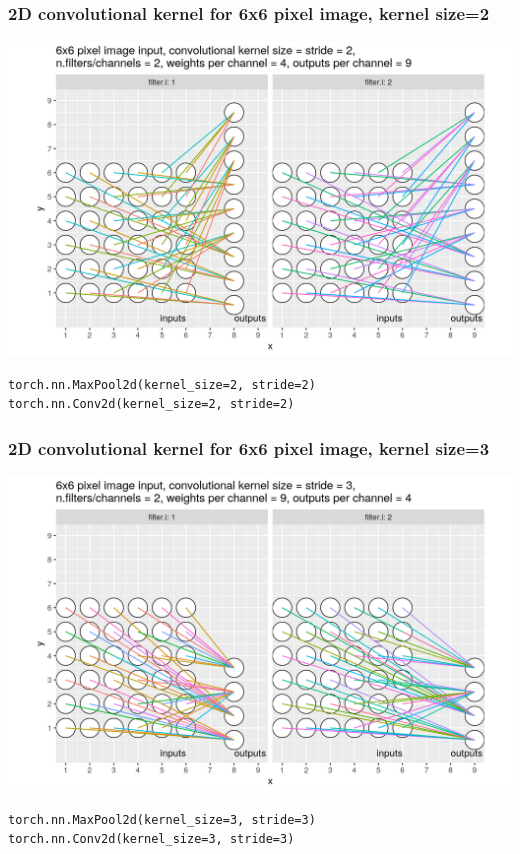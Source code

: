 \documentclass{beamer}
\begin{document}
\begin{frame}[fragile]
  \frametitle{2D convolutional kernel for 6x6 pixel image, kernel size=2}
  \includegraphics[width=\textwidth]{figure-conv2d-6x6-kernel=2}
\begin{verbatim}
torch.nn.MaxPool2d(kernel_size=2, stride=2)
torch.nn.Conv2d(kernel_size=2, stride=2)
\end{verbatim}
\end{frame}

\begin{frame}[fragile]
  \frametitle{2D convolutional kernel for 6x6 pixel image, kernel size=3}
  \includegraphics[width=\textwidth]{figure-conv2d-6x6-kernel=3}
\begin{verbatim}
torch.nn.MaxPool2d(kernel_size=3, stride=3)
torch.nn.Conv2d(kernel_size=3, stride=3)
\end{verbatim}
\end{frame}
\end{document}

